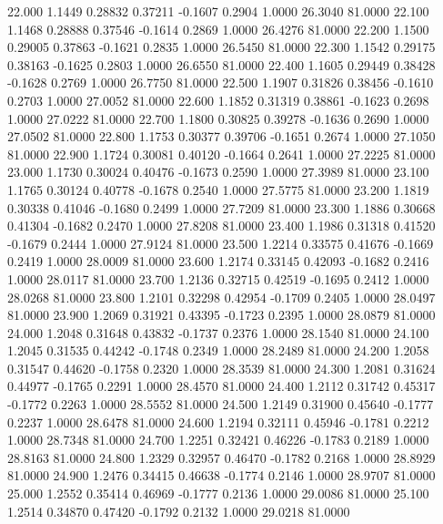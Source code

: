   22.000   1.1449   0.28832   0.37211  -0.1607   0.2904   1.0000  26.3040  81.0000
  22.100   1.1468   0.28888   0.37546  -0.1614   0.2869   1.0000  26.4276  81.0000
  22.200   1.1500   0.29005   0.37863  -0.1621   0.2835   1.0000  26.5450  81.0000
  22.300   1.1542   0.29175   0.38163  -0.1625   0.2803   1.0000  26.6550  81.0000
  22.400   1.1605   0.29449   0.38428  -0.1628   0.2769   1.0000  26.7750  81.0000
  22.500   1.1907   0.31826   0.38456  -0.1610   0.2703   1.0000  27.0052  81.0000
  22.600   1.1852   0.31319   0.38861  -0.1623   0.2698   1.0000  27.0222  81.0000
  22.700   1.1800   0.30825   0.39278  -0.1636   0.2690   1.0000  27.0502  81.0000
  22.800   1.1753   0.30377   0.39706  -0.1651   0.2674   1.0000  27.1050  81.0000
  22.900   1.1724   0.30081   0.40120  -0.1664   0.2641   1.0000  27.2225  81.0000
  23.000   1.1730   0.30024   0.40476  -0.1673   0.2590   1.0000  27.3989  81.0000
  23.100   1.1765   0.30124   0.40778  -0.1678   0.2540   1.0000  27.5775  81.0000
  23.200   1.1819   0.30338   0.41046  -0.1680   0.2499   1.0000  27.7209  81.0000
  23.300   1.1886   0.30668   0.41304  -0.1682   0.2470   1.0000  27.8208  81.0000
  23.400   1.1986   0.31318   0.41520  -0.1679   0.2444   1.0000  27.9124  81.0000
  23.500   1.2214   0.33575   0.41676  -0.1669   0.2419   1.0000  28.0009  81.0000
  23.600   1.2174   0.33145   0.42093  -0.1682   0.2416   1.0000  28.0117  81.0000
  23.700   1.2136   0.32715   0.42519  -0.1695   0.2412   1.0000  28.0268  81.0000
  23.800   1.2101   0.32298   0.42954  -0.1709   0.2405   1.0000  28.0497  81.0000
  23.900   1.2069   0.31921   0.43395  -0.1723   0.2395   1.0000  28.0879  81.0000
  24.000   1.2048   0.31648   0.43832  -0.1737   0.2376   1.0000  28.1540  81.0000
  24.100   1.2045   0.31535   0.44242  -0.1748   0.2349   1.0000  28.2489  81.0000
  24.200   1.2058   0.31547   0.44620  -0.1758   0.2320   1.0000  28.3539  81.0000
  24.300   1.2081   0.31624   0.44977  -0.1765   0.2291   1.0000  28.4570  81.0000
  24.400   1.2112   0.31742   0.45317  -0.1772   0.2263   1.0000  28.5552  81.0000
  24.500   1.2149   0.31900   0.45640  -0.1777   0.2237   1.0000  28.6478  81.0000
  24.600   1.2194   0.32111   0.45946  -0.1781   0.2212   1.0000  28.7348  81.0000
  24.700   1.2251   0.32421   0.46226  -0.1783   0.2189   1.0000  28.8163  81.0000
  24.800   1.2329   0.32957   0.46470  -0.1782   0.2168   1.0000  28.8929  81.0000
  24.900   1.2476   0.34415   0.46638  -0.1774   0.2146   1.0000  28.9707  81.0000
  25.000   1.2552   0.35414   0.46969  -0.1777   0.2136   1.0000  29.0086  81.0000
  25.100   1.2514   0.34870   0.47420  -0.1792   0.2132   1.0000  29.0218  81.0000
